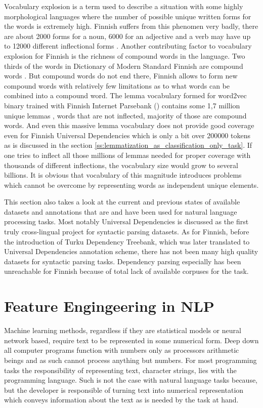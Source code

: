 \documentclass[12pt,a4paper,english
]{tutthesis}
\begin{document}
Vocabulary explosion is a term used to describe a situation with some highly morphological languages where the number of possible unique written forms for the words is extremely high. Finnish suffers from this phenomen very badly, there are about 2000 forms for a noun, 6000 for an adjective and a verb may have up to 12000 different inflectional forms \cite{Korenius2004}. Another contributing factor to vocabulary explosion for Finnish is the richness of compound words in the language. Two thirds of the words in Dictionary of Modern Standard Finnish are compound words \cite{Korenius2004}. But compound words do not end there, Finnish allows to form new compound words with relatively few limitations as to what words can be combined into a compound word. The lemma vocabulary formed for word2vec binary trained with Finnish Internet Parsebank (\cite{Kanerva2014}) contains some 1,7 million unique lemmas , words that are not inflected, majority of those are compound words. And even this massive lemma vocabulary does not provide good coverage even for Finnish Universal Dependencies which is only a bit over 200000 tokens \cite{Haverinen2014} as is discussed in the section \ref{ss:lemmatization_as_classification_only_task}. If one tries to inflect all those millions of lemmas needed for proper coverage with thousands of different inflections, the vocabulary size would grow to several billions. It is obvious that vocabulary of this magnitude introduces problems which cannot be overcome by representing words as independent unique elements.

This section also takes a look at the current and previous states of available datasets and annotations that are and have been used for natural language processing tasks. Most notably Universal Dependencies is discussed as the first truly cross-lingual project for syntactic parsing datasets. As for Finnish, before the introduction of Turku Dependency Treebank, which was later translated to Universal Dependencies annotation scheme, there has not been many high quality datasets for syntactic parsing tasks. Dependency parsing especially has been unreachable for Finnish because of total lack of available corpuses for the task.

\section{Feature Engingeering in NLP}
\label{ch:feature_engineering_in_nlp}
Machine learning methods, regardless if they are statistical models or neural network based, require text to be represented in some numerical form. Deep down all computer programs function with numbers only as processors arithmetic beings and as such cannot process anything but numbers. For most programming tasks the responsibility of representing text, character strings, lies with the programming language. Such is not the case with natural language tasks because, but the developer is responsible of turning text into numerical representation which conveys information about the text as is needed by the task at hand.
\end{document}
